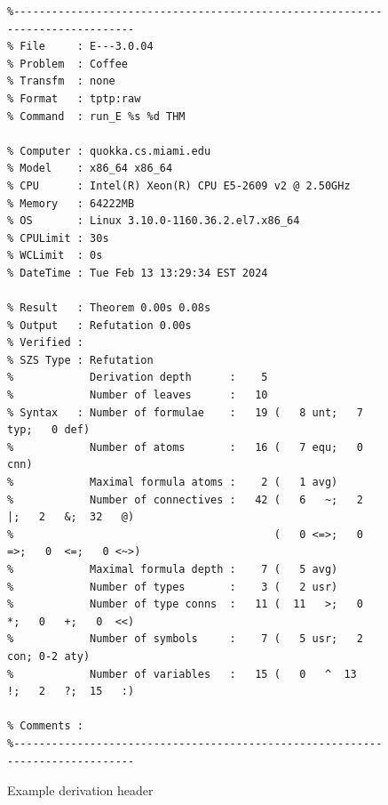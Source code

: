 \documentclass{easychair}
\begin{document}
\begin{figure}[htb]
{\footnotesize
{\setlength{\baselineskip}{3mm}
\begin{verbatim}
%------------------------------------------------------------------------------
% File     : E---3.0.04
% Problem  : Coffee 
% Transfm  : none
% Format   : tptp:raw
% Command  : run_E %s %d THM

% Computer : quokka.cs.miami.edu
% Model    : x86_64 x86_64
% CPU      : Intel(R) Xeon(R) CPU E5-2609 v2 @ 2.50GHz
% Memory   : 64222MB
% OS       : Linux 3.10.0-1160.36.2.el7.x86_64
% CPULimit : 30s
% WCLimit  : 0s
% DateTime : Tue Feb 13 13:29:34 EST 2024

% Result   : Theorem 0.00s 0.08s
% Output   : Refutation 0.00s
% Verified :
% SZS Type : Refutation
%            Derivation depth      :    5
%            Number of leaves      :   10
% Syntax   : Number of formulae    :   19 (   8 unt;   7 typ;   0 def)
%            Number of atoms       :   16 (   7 equ;   0 cnn)
%            Maximal formula atoms :    2 (   1 avg)
%            Number of connectives :   42 (   6   ~;   2   |;   2   &;  32   @)
%                                         (   0 <=>;   0  =>;   0  <=;   0 <~>)
%            Maximal formula depth :    7 (   5 avg)
%            Number of types       :    3 (   2 usr)
%            Number of type conns  :   11 (  11   >;   0   *;   0   +;   0  <<)
%            Number of symbols     :    7 (   5 usr;   2 con; 0-2 aty)
%            Number of variables   :   15 (   0   ^  13   !;   2   ?;  15   :)

% Comments :
%------------------------------------------------------------------------------
\end{verbatim}
}}
\caption{Example derivation header}
\label{ExampleDerivationHeader}
\end{figure}
\end{document}
